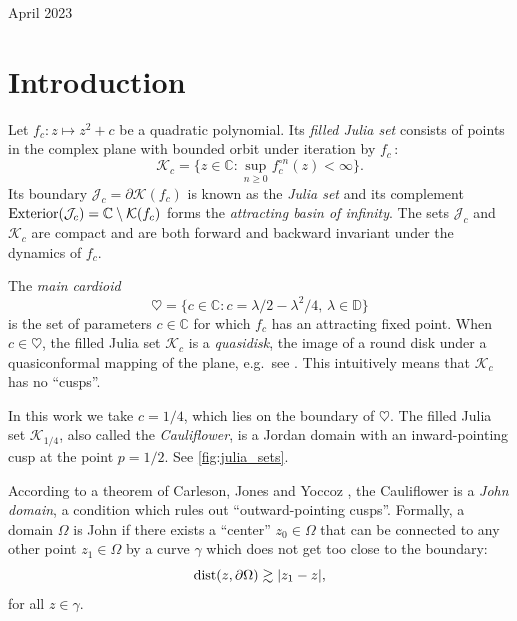 \begin{onehalfspace}
\begin{center}
April 2023
\par\end{center}
\end{onehalfspace}

% 
\newpage


\section{Introduction}

Let $f_c: z\mapsto z^2 + c$ be a quadratic polynomial. Its {\em filled Julia set} consists of points in the complex plane with bounded orbit
under iteration by $f_c$\,:
$$
\mathcal K_c = \bigl \{z \in \mathbb{C} : \sup_{n \ge 0} f_c^{\circ n}(z) < \infty \bigr \}.
$$
Its boundary $\mathcal J_c = \partial \mathcal K(f_c)$ is known as the {\em Julia set}\/ and its complement $\operatorname{Exterior}(\mathcal{J}_c) = \mathbb{C} \setminus \mathcal K(f_c)$ forms the {\em attracting basin of infinity}. The sets $\mathcal J_c$ and $\mathcal K_c$ are compact and are both forward and backward invariant under the dynamics of $f_c$.
 
The {\em main cardioid}
$$
\heartsuit = \bigl  \{c \in \mathbb{C}: c = \lambda/2 - \lambda^2/4,\, \lambda \in \mathbb{D} \bigr \}
$$
is the set of parameters $c \in \mathbb{C}$ for which $f_c$ has an attracting fixed point.
When $c \in \heartsuit$, the filled Julia set $\mathcal K_c$ is a \emph{quasidisk}\/, the image of a round disk under a quasiconformal mapping of the plane, e.g.~see \cite[Theorem VI.2.1]{gamelin2003complex}.
This intuitively means that $\mathcal K_c$ has no \enquote{cusps}.


In this work we take $c=1/4$, which lies on the boundary of $\heartsuit$. 
The filled Julia set $\mathcal K_{1/4}$, also called the \emph{Cauliflower}, 
is a Jordan domain with an inward-pointing cusp at the point $p=1/2$. See \cref{fig:julia_sets}.

According to a theorem of Carleson, Jones and Yoccoz \cite[Theorem 6.1]{carleson_julia_1994}, 
the Cauliflower is a \emph{John domain}\/, a condition which rules out \enquote{outward-pointing cusps}. 
Formally, a domain $\Omega$ is John if there exists a \enquote{center} 
$z_0 \in \Omega$ that can be connected 
to any other point $z_1\in \Omega$ by a curve $\gamma$ which does not get too close to the boundary:
\begin{equation}
	\operatorname{dist}(z, \partial \Omega) \gtrsim |z_1-z|,
\end{equation} for all $z\in \gamma$.


